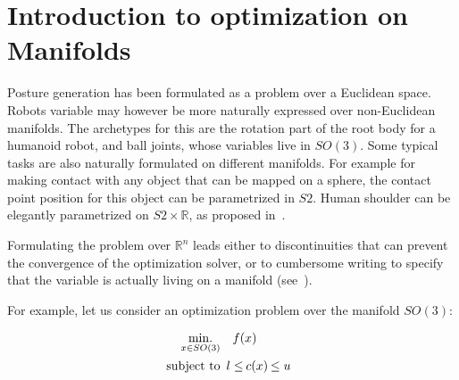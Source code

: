 
\section{Introduction to optimization on Manifolds}
\label{sec:introduction_to_optimization_on_manifolds}

Posture generation has been formulated as a problem over a Euclidean space.
Robots variable may however be more naturally expressed over non-Euclidean manifolds.
The archetypes for this are the rotation part of the root body for a humanoid robot, and ball joints, whose variables live in $SO(3)$.
Some typical tasks are also naturally formulated on different manifolds.
For example for making contact with any object that can be mapped on a sphere, the contact point position for this object can be parametrized in $S2$.
Human shoulder can be elegantly parametrized on $S2\times\mathbb{R}$, as proposed in~\cite{baerlocher}.

Formulating the problem over $\mathbb{R}^n$ leads either to discontinuities that can prevent the convergence of the optimization solver, or to cumbersome writing to specify that the variable is actually living on a manifold (see~\cite{bouyarmane:humanoids:2012}).

For example, let us consider an optimization problem over the manifold $SO(3)$:

\begin{align}
\label{eq:pb_on_SO3}
  \minimize_{x \in SO(3)} & \quad f(x)\\
  \text{subject to}&
  \begin{array}{rcl}
    {l} \leq & \reduce{c(x)}{8}& \leq {u} \nonumber
  \end{array}
\end{align}

